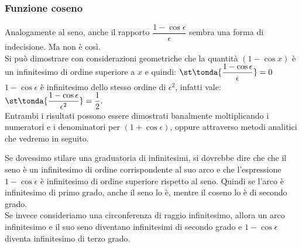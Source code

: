 \subsubsection{Funzione coseno}
\label{subsubsec:insnum_fcoseno}
Analogamente al seno, anche il rapporto \(\dfrac{1-\cos \epsilon}{\epsilon}\)
sembra una forma di indecisione. 
Ma non è così. \\

Si può dimostrare con considerazioni geometriche che 
la quantità \((1-\cos x)\) è un infinitesimo di ordine superiore a 
\(x\) e quindi: \qquad
\(\displaystyle
 \st\tonda{\frac{1-\cos \epsilon}{\epsilon}}=0
\) \\

\(1-\cos \epsilon\) è infinitesimo dello stesso ordine di \(\epsilon^2\), 
infatti vale: \qquad
\(\displaystyle
 \st\tonda{\frac{1-\cos \epsilon}{\epsilon^2}}=\frac{1}{2}.
\) \\

Entrambi i risultati possono essere dimostrati banalmente moltiplicando i 
numeratori e i denominatori per \((1+\cos \epsilon)\), oppure attraverso 
metodi analitici che vedremo in seguito.

\begin{osservazione}
Se dovessimo stilare una graduatoria di infinitesimi, si dovrebbe dire che 
che il seno è un infinitesimo di ordine corrispondente al suo arco e che 
l'espressione \(1-\cos \epsilon\) è infinitesimo di ordine superiore 
rispetto al seno.
Quindi se l'arco è infinitesimo di primo grado, anche il seno lo è, mentre
il coseno lo è di secondo grado.\\
Se invece consideriamo una circonferenza di raggio infinitesimo, 
allora un arco infinitesimo e il suo seno diventano infinitesimi di secondo 
grado e \(1-\cos \epsilon\) diventa infinitesimo di terzo grado.
\end{osservazione}

